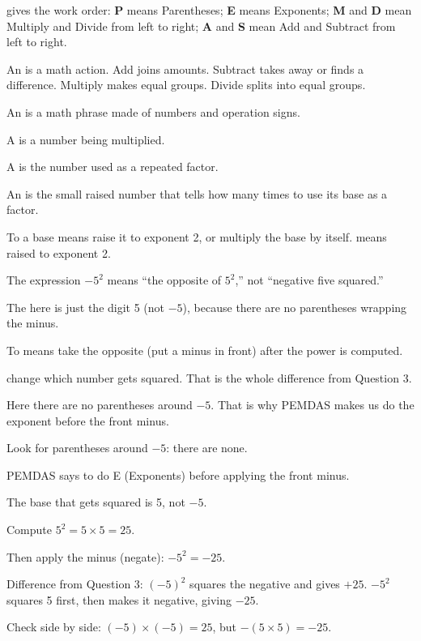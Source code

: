 \begin{words}
  \item {}gives the work order: \textbf{P} means Parentheses; \textbf{E} means Exponents; \textbf{M} and \textbf{D} mean Multiply and Divide from left to right; \textbf{A} and \textbf{S} mean Add and Subtract from left to right.
  \item An is a math action. Add joins amounts. Subtract takes away or finds a difference. Multiply makes equal groups. Divide splits into equal groups.
  \item An is a math phrase made of numbers and operation signs.
  \item A is a number being multiplied.
  \item A is the number used as a repeated factor.
  \item An is the small raised number that tells how many times to use its base as a factor.
  \item To a base means raise it to exponent 2, or multiply the base by itself. means raised to exponent 2.
  \item The expression $-5^{2}$ means ``the opposite of $5^{2}$,'' not ``negative five squared.''
  \item The here is just the digit 5 (not $-5$), because there are no parentheses wrapping the minus.
  \item To means take the opposite (put a minus in front) after the power is computed.
  \item {}change which number gets squared. That is the whole difference from Question 3.
  \item Here there are no parentheses around $-5$. That is why PEMDAS makes us do the exponent before the front minus.
\end{words}

\begin{steps}
  \item Look for parentheses around $-5$: there are none.
  \item PEMDAS says to do E (Exponents) before applying the front minus.
  \item The base that gets squared is 5, not $-5$.
  \item Compute $5^{2} = 5 \times 5 = 25$.
  \item Then apply the minus (negate): $-5^{2} = -25$.
  \item Difference from Question 3: $(-5)^{2}$ squares the negative and gives $+25$. $-5^{2}$ squares 5 first, then makes it negative, giving $-25$.
  \item Check side by side: $(-5) \times (-5) = 25$, but $-(5 \times 5) = -25$.
\end{steps}

